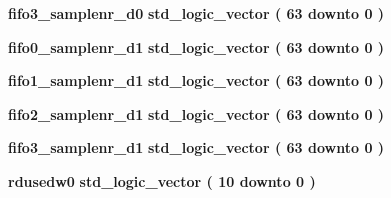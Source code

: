 \begin{DoxyCompactItemize}
\item 
{\bf fifo3\+\_\+samplenr\+\_\+d0} {\bfseries \textcolor{comment}{std\+\_\+logic\+\_\+vector}\textcolor{vhdlchar}{ }\textcolor{vhdlchar}{(}\textcolor{vhdlchar}{ }\textcolor{vhdlchar}{ } \textcolor{vhdldigit}{63} \textcolor{vhdlchar}{ }\textcolor{keywordflow}{downto}\textcolor{vhdlchar}{ }\textcolor{vhdlchar}{ } \textcolor{vhdldigit}{0} \textcolor{vhdlchar}{ }\textcolor{vhdlchar}{)}\textcolor{vhdlchar}{ }} 
\item 
{\bf fifo0\+\_\+samplenr\+\_\+d1} {\bfseries \textcolor{comment}{std\+\_\+logic\+\_\+vector}\textcolor{vhdlchar}{ }\textcolor{vhdlchar}{(}\textcolor{vhdlchar}{ }\textcolor{vhdlchar}{ } \textcolor{vhdldigit}{63} \textcolor{vhdlchar}{ }\textcolor{keywordflow}{downto}\textcolor{vhdlchar}{ }\textcolor{vhdlchar}{ } \textcolor{vhdldigit}{0} \textcolor{vhdlchar}{ }\textcolor{vhdlchar}{)}\textcolor{vhdlchar}{ }} 
\item 
{\bf fifo1\+\_\+samplenr\+\_\+d1} {\bfseries \textcolor{comment}{std\+\_\+logic\+\_\+vector}\textcolor{vhdlchar}{ }\textcolor{vhdlchar}{(}\textcolor{vhdlchar}{ }\textcolor{vhdlchar}{ } \textcolor{vhdldigit}{63} \textcolor{vhdlchar}{ }\textcolor{keywordflow}{downto}\textcolor{vhdlchar}{ }\textcolor{vhdlchar}{ } \textcolor{vhdldigit}{0} \textcolor{vhdlchar}{ }\textcolor{vhdlchar}{)}\textcolor{vhdlchar}{ }} 
\item 
{\bf fifo2\+\_\+samplenr\+\_\+d1} {\bfseries \textcolor{comment}{std\+\_\+logic\+\_\+vector}\textcolor{vhdlchar}{ }\textcolor{vhdlchar}{(}\textcolor{vhdlchar}{ }\textcolor{vhdlchar}{ } \textcolor{vhdldigit}{63} \textcolor{vhdlchar}{ }\textcolor{keywordflow}{downto}\textcolor{vhdlchar}{ }\textcolor{vhdlchar}{ } \textcolor{vhdldigit}{0} \textcolor{vhdlchar}{ }\textcolor{vhdlchar}{)}\textcolor{vhdlchar}{ }} 
\item 
{\bf fifo3\+\_\+samplenr\+\_\+d1} {\bfseries \textcolor{comment}{std\+\_\+logic\+\_\+vector}\textcolor{vhdlchar}{ }\textcolor{vhdlchar}{(}\textcolor{vhdlchar}{ }\textcolor{vhdlchar}{ } \textcolor{vhdldigit}{63} \textcolor{vhdlchar}{ }\textcolor{keywordflow}{downto}\textcolor{vhdlchar}{ }\textcolor{vhdlchar}{ } \textcolor{vhdldigit}{0} \textcolor{vhdlchar}{ }\textcolor{vhdlchar}{)}\textcolor{vhdlchar}{ }} 
\item 
{\bf rdusedw0} {\bfseries \textcolor{comment}{std\+\_\+logic\+\_\+vector}\textcolor{vhdlchar}{ }\textcolor{vhdlchar}{(}\textcolor{vhdlchar}{ }\textcolor{vhdlchar}{ } \textcolor{vhdldigit}{10} \textcolor{vhdlchar}{ }\textcolor{keywordflow}{downto}\textcolor{vhdlchar}{ }\textcolor{vhdlchar}{ } \textcolor{vhdldigit}{0} \textcolor{vhdlchar}{ }\textcolor{vhdlchar}{)}\textcolor{vhdlchar}{ }} 

\end{DoxyCompactItemize}

